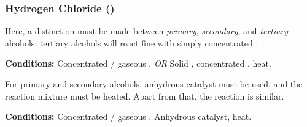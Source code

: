 
			\pagebreak
			\subsubsection{Hydrogen Chloride ()}

				Here, a distinction must be made between \textit{primary}, \textit{secondary}, and \textit{tertiary} alcohols;
				tertiary alcohols will react fine with simply concentrated .

				\vspace{1.5em}
				\vbox{\textbf{Conditions:}	\tabto{35mm}Concentrated  / gaseous , \textit{OR}
											\tabto{35mm}Solid , concentrated , heat.}



				For primary and secondary alcohols, anhydrous  catalyst must be used, and the reaction mixture
				must be heated. Apart from that, the reaction is similar.

				\vspace{1.5em}
				\vbox{\textbf{Conditions:}	\tabto{35mm}Concentrated  / gaseous .
											\tabto{35mm}Anhydrous  catalyst, heat.}


